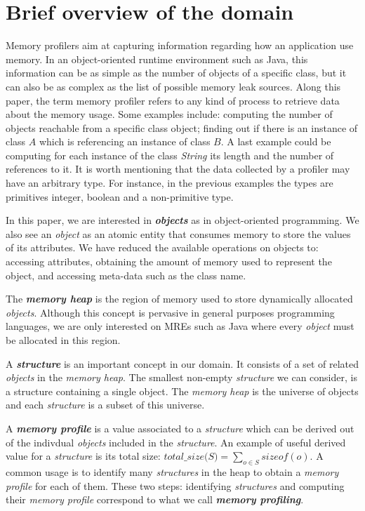 
\section{Brief overview of the domain} \label{sec:domain-overview}

Memory profilers aim at capturing information regarding how an application use memory.
In an object-oriented runtime environment such as Java, this information can be as simple as the number of objects of a specific class, but it can also be  as complex  as the list of possible memory leak sources.
Along this paper, the term memory profiler refers to any kind of process to retrieve data about the memory usage.
Some examples include: computing the number of objects reachable from a specific class object; finding out if there is an instance of class $A$ which is referencing an instance of class $B$.
A last example could be computing for each instance of the class \textit{String} its length and the number of references to it.
It is worth mentioning that the data collected by a profiler may have an arbitrary type.
For instance, in the previous examples the types are primitives integer, boolean and a non-primitive type.


In this paper, we are interested in \textbf{\textit{objects}} as in object-oriented programming.
We also see an \textit{object} as an atomic entity that consumes memory to store the values of its attributes.
We have  reduced the available operations on objects to: accessing attributes, obtaining the amount of memory used to represent the object, and accessing meta-data such as the class name.

The \textbf{\textit{memory heap}} is the region of memory used to store dynamically allocated \textit{objects}.
Although this concept is pervasive in general purposes programming languages, we are only interested on MREs such as Java where every \textit{object} must be allocated in this region.

A \textbf{\textit{structure}} is an important concept in our domain.
It consists of a set of related \textit{objects} in the \textit{memory heap}.
The smallest non-empty \textit{structure} we can consider, is a structure containing a single object.
The \textit{memory heap} is the universe of objects and each \textit{structure} is a subset of this universe.

A \textbf{\textit{memory profile}} is a value associated to a \textit{structure} which can be derived out of the indivdual \textit{objects} included in the \textit{structure}. 
An example of useful derived value for a \textit{structure} is its total size: $\textit{total\_size(S)} = \sum_{o \in S} {sizeof(o)}$.
A common usage is to identify many \textit{structures} in the heap to obtain a \textit{memory profile} for each of them.
These two steps: identifying \textit{structures} and computing their \textit{memory profile} correspond to what we call \textbf{\textit{memory profiling}}. 

